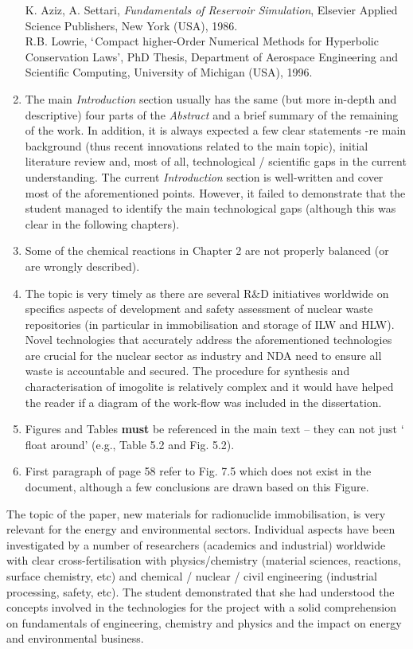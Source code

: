 \documentclass[14pt,twoside]{report}
\begin{document}
\begin{enumerate}
\noindent
[41] K. Aziz, A. Settari, {\it Fundamentals of Reservoir Simulation}, Elsevier Applied Science Publishers, New York (USA), 1986.\\
\noindent
[42] R.B. Lowrie, $\lq$Compact higher-Order Numerical Methods for Hyperbolic Conservation Laws', PhD Thesis, Department of Aerospace Engineering and Scientific Computing, University of Michigan (USA), 1996.
%
\item The main {\it Introduction} section usually has the same (but more in-depth and descriptive) four parts of the {\it Abstract} and a brief summary of the remaining of the work. In addition, it is always expected a few clear statements -re main background (thus recent innovations related to the main topic), initial literature review and, most of all, technological / scientific gaps in the current understanding. The current {\it Introduction} section is well-written and cover most of the aforementioned points. However, it failed to demonstrate that the student managed to identify the main technological gaps (although this was clear in the following chapters).
%
\item Some of the chemical reactions in Chapter 2 are not properly balanced (or are wrongly described).
%
\item The topic is very timely as there are several R$\&$D initiatives worldwide on specifics aspects of development and safety assessment of nuclear waste repositories (in particular in immobilisation and storage of ILW and HLW). Novel technologies that accurately address the aforementioned technologies are crucial for the  nuclear sector as industry and NDA need to ensure all waste is accountable and secured. The procedure for synthesis and characterisation of imogolite is relatively complex and it would have helped the reader if a diagram of the work-flow was included in the dissertation. 
%
\item Figures and Tables {\bf must} be referenced in the main text -- they can not just $\lq$float around' (e.g., Table 5.2 and Fig. 5.2). 
%
\item First paragraph of page 58 refer to Fig. 7.5 which does not exist in the document, although a few conclusions are drawn based on this Figure. 
%
\end{enumerate}

The topic of the paper, new materials for radionuclide immobilisation, is very relevant for the energy and environmental sectors. Individual aspects have been investigated by a number of researchers (academics and industrial) worldwide with clear cross-fertilisation with physics/chemistry (material sciences, reactions, surface chemistry, etc) and chemical / nuclear / civil engineering (industrial processing, safety, etc). The student demonstrated that she had understood the concepts involved in the technologies for the project with a solid comprehension on fundamentals of engineering, chemistry and physics and the impact on energy and environmental business.    
\end{document}
